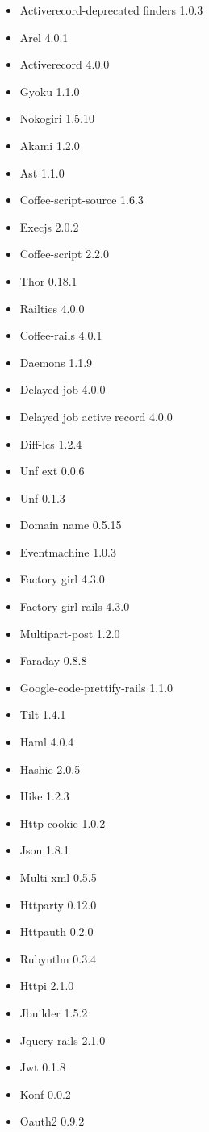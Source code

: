 \begin{itemize}
\item Activerecord-deprecated finders 1.0.3
\item Arel 4.0.1
\item Activerecord 4.0.0
\item Gyoku 1.1.0
\item Nokogiri 1.5.10
\item Akami 1.2.0
\item Ast 1.1.0
\item Coffee-script-source 1.6.3
\item Execjs 2.0.2
\item Coffee-script 2.2.0
\item Thor 0.18.1
\item Railties 4.0.0
\item Coffee-rails 4.0.1
\item Daemons 1.1.9
\item Delayed job 4.0.0
\item Delayed job active record 4.0.0
\item Diff-lcs 1.2.4
\item Unf ext 0.0.6
\item Unf 0.1.3
\item Domain name 0.5.15
\item Eventmachine 1.0.3
\item Factory girl 4.3.0
\item Factory girl rails 4.3.0
\item Multipart-post 1.2.0
\item Faraday 0.8.8
\item Google-code-prettify-rails 1.1.0
\item Tilt 1.4.1
\item Haml 4.0.4
\item Hashie 2.0.5
\item Hike 1.2.3
\item Http-cookie 1.0.2
\item Json 1.8.1
\item Multi xml 0.5.5
\item Httparty 0.12.0
\item Httpauth 0.2.0
\item Rubyntlm 0.3.4
\item Httpi 2.1.0
\item Jbuilder 1.5.2
\item Jquery-rails 2.1.0
\item Jwt 0.1.8
\item Konf 0.0.2
\item Oauth2 0.9.2

\end{itemize}
